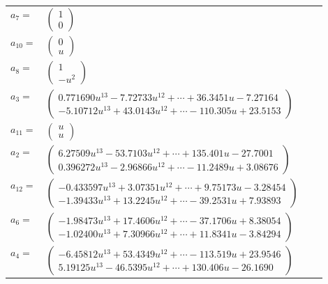 \documentclass[1p]{elsarticle_modified}
\theoremstyle{definition}
\begin{document}
\begin{tabular}{m{7pt} m{180pt} m{7pt} m{180pt} }
\flushright $a_{7}=$&$\begin{pmatrix}1\\0\end{pmatrix}$ \\
\flushright $a_{10}=$&$\begin{pmatrix}0\\u\end{pmatrix}$ \\
\flushright $a_{8}=$&$\begin{pmatrix}1\\- u^2\end{pmatrix}$ \\
\flushright $a_{3}=$&$\begin{pmatrix}0.771690 u^{13}-7.72733 u^{12}+\cdots+36.3451 u-7.27164\\-5.10712 u^{13}+43.0143 u^{12}+\cdots-110.305 u+23.5153\end{pmatrix}$ \\
\flushright $a_{11}=$&$\begin{pmatrix}u\\u\end{pmatrix}$ \\
\flushright $a_{2}=$&$\begin{pmatrix}6.27509 u^{13}-53.7103 u^{12}+\cdots+135.401 u-27.7001\\0.396272 u^{13}-2.96866 u^{12}+\cdots-11.2489 u+3.08676\end{pmatrix}$ \\
\flushright $a_{12}=$&$\begin{pmatrix}-0.433597 u^{13}+3.07351 u^{12}+\cdots+9.75173 u-3.28454\\-1.39433 u^{13}+13.2245 u^{12}+\cdots-39.2531 u+7.93893\end{pmatrix}$ \\
\flushright $a_{6}=$&$\begin{pmatrix}-1.98473 u^{13}+17.4606 u^{12}+\cdots-37.1706 u+8.38054\\-1.02400 u^{13}+7.30966 u^{12}+\cdots+11.8341 u-3.84294\end{pmatrix}$ \\
\flushright $a_{4}=$&$\begin{pmatrix}-6.45812 u^{13}+53.4349 u^{12}+\cdots-113.519 u+23.9546\\5.19125 u^{13}-46.5395 u^{12}+\cdots+130.406 u-26.1690\end{pmatrix}$ \\

\end{tabular}
\end{document}
